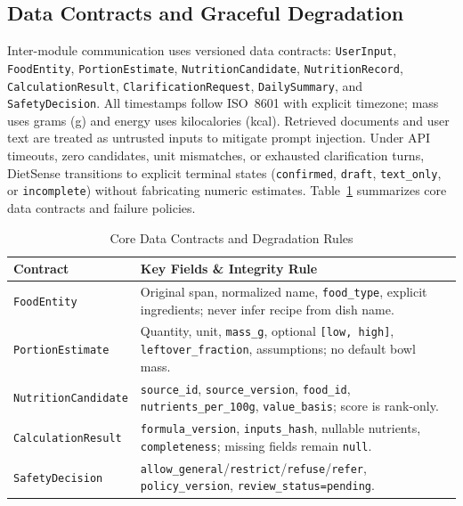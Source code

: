 \documentclass[conference]{IEEEtran}
\begin{document}
\subsection{Data Contracts and Graceful Degradation}
Inter-module communication uses versioned data contracts: \texttt{UserInput}, \texttt{FoodEntity}, \texttt{PortionEstimate}, \texttt{NutritionCandidate}, \texttt{NutritionRecord}, \texttt{CalculationResult}, \texttt{ClarificationRequest}, \texttt{DailySummary}, and \texttt{SafetyDecision}. All timestamps follow ISO~8601 with explicit timezone; mass uses grams (g) and energy uses kilocalories (kcal). Retrieved documents and user text are treated as untrusted inputs to mitigate prompt injection. Under API timeouts, zero candidates, unit mismatches, or exhausted clarification turns, DietSense transitions to explicit terminal states (\texttt{confirmed}, \texttt{draft}, \texttt{text\_only}, or \texttt{incomplete}) without fabricating numeric estimates. Table~\ref{tab:contracts} summarizes core data contracts and failure policies.

\begin{table}[t]
\centering
\caption{Core Data Contracts and Degradation Rules}
\label{tab:contracts}
\renewcommand{\arraystretch}{1.12}
\begin{tabularx}{\columnwidth}{@{}l X@{}}
\toprule
\textbf{Contract} & \textbf{Key Fields \& Integrity Rule} \\
\midrule
\texttt{FoodEntity} & Original span, normalized name, \texttt{food\_type}, explicit ingredients; never infer recipe from dish name. \\
\texttt{PortionEstimate} & Quantity, unit, \texttt{mass\_g}, optional \texttt{[low, high]}, \texttt{leftover\_fraction}, assumptions; no default bowl mass. \\
\texttt{NutritionCandidate} & \texttt{source\_id}, \texttt{source\_version}, \texttt{food\_id}, \texttt{nutrients\_per\_100g}, \texttt{value\_basis}; score is rank-only. \\
\texttt{CalculationResult} & \texttt{formula\_version}, \texttt{inputs\_hash}, nullable nutrients, \texttt{completeness}; missing fields remain \texttt{null}. \\
\texttt{SafetyDecision} & \texttt{allow\_general}/\texttt{restrict}/\texttt{refuse}/\texttt{refer}, \texttt{policy\_version}, \texttt{review\_status=pending}. \\
\bottomrule
\end{tabularx}
\end{table}
\end{document}
